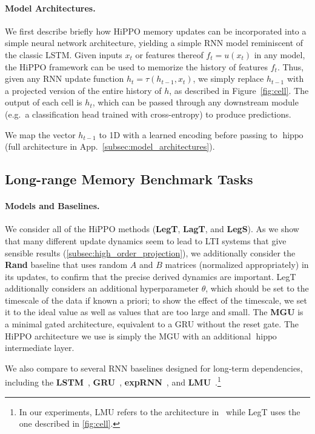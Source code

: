 \documentclass{article}
\DeclareMathOperator{\hippo}{hippo}
\begin{document}
\paragraph{Model Architectures.}
We first describe briefly how HiPPO memory updates can be incorporated into a
simple neural network architecture, yielding a simple RNN model reminiscent of
the classic LSTM.
Given inputs $x_t$ or features thereof $f_t = u(x_t)$ in any model, the HiPPO
framework can be used to memorize the history of features $f_t$.
Thus, given any RNN update function $h_{t} = \tau(h_{t-1}, x_t)$, we simply replace
$h_{t-1}$ with a projected version of the entire history of $h$, as described in
Figure~\ref{fig:cell}.
The output of each cell is $h_t$, which can be passed through any downstream module (e.g.\ a classification head trained with cross-entropy) to produce predictions.

We map the vector $h_{t-1}$ to 1D with a learned encoding before passing to
$\hippo$ (full architecture in App.~\ref{subsec:model_architectures}).


\subsection{Long-range Memory Benchmark Tasks}
\label{subsec:membenchmark}


\paragraph{Models and Baselines.}
We consider all of the HiPPO methods (\textbf{LegT}, \textbf{LagT}, and \textbf{LegS}).
As we show that many different update dynamics seem to lead to LTI systems that give sensible results (\cref{subsec:high_order_projection}), we additionally consider the \textbf{Rand} baseline that uses random $A$ and $B$ matrices (normalized appropriately) in its updates,
to confirm that the precise derived dynamics are important.
LegT additionally considers an additional hyperparameter $\theta$, which should be set to the timescale of the data if known a priori; to show the effect of the timescale, we set it to the ideal value as well as values that are too large and small.
The \textbf{MGU} is a minimal gated architecture, equivalent to a GRU without the reset gate. The HiPPO architecture we use is simply the MGU with an additional $\hippo$ intermediate layer.

We also compare to several RNN baselines designed for long-term dependencies, including the
\textbf{LSTM}~\cite{lstm}, \textbf{GRU}~\cite{chung2014empirical}, \textbf{expRNN}~\citep{lezcano2019cheap}, and \textbf{LMU}~\citep{voelker2019legendre}.\footnote{In our experiments, LMU refers to the architecture in~\citep{voelker2019legendre} while LegT uses the one described in \cref{fig:cell}.}
\end{document}
